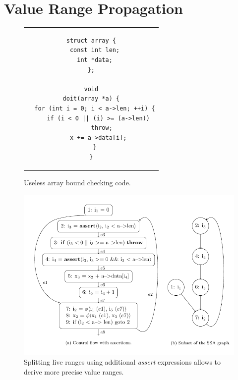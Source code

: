 \section{Value Range Propagation}
\label{novillo:sec:vrp}

\begin{figure}[b!]
  \begin{center}
    \begin{tabular}{c}
      \begin{lstlisting}
struct array {
  const int len;
  int *data;
};

void
doit(array *a) {
  for (int i = 0; i < a->len; ++i) {
    if (i < 0 || (i) >= (a->len))
      throw;
    x += a->data[i];
  }
}
      \end{lstlisting}
    \end{tabular}
  \end{center}
  \caption{Useless array bound checking code.}
  \label{novillo:fig:vrp-1}
\end{figure}

\begin{figure}[t!]
  \vspace{-1em}
  \begin{center}
    \includegraphics{value_range_propagation}
  \end{center}
  \vspace{-2em}
  \caption{Splitting live ranges using additional \emph{assert} expressions
           allows to derive more precise value ranges.}
  \subfigure{\label{novillo:fig:vrp-2:a}}
  \subfigure{\label{novillo:fig:vrp-2:b}}
  \label{novillo:fig:vrp-2}
\end{figure}

